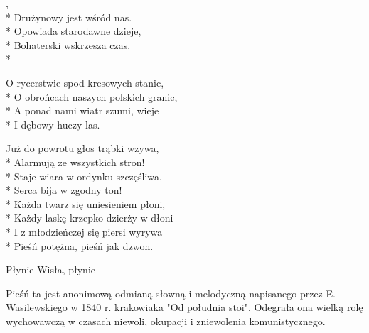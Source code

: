 \begin{lyrics}[longestline={O obrońcach naszych polskich granic,}]

,\\*
Drużynowy jest wśród nas.\\*
Opowiada starodawne dzieje,\\*
Bohaterski wskrzesza czas.\\*
\begin{indented}
O rycerstwie spod kresowych stanic,\\*
O obrońcach naszych polskich granic,\\*
A ponad nami wiatr szumi, wieje\\*
I dębowy huczy las.
\end{indented}

Już do powrotu głos trąbki wzywa,\\*
Alarmują ze wszystkich stron!\\*
Staje wiara w ordynku szczęśliwa,\\*
Serca bija w zgodny ton!\\*
Każda twarz się uniesieniem płoni,\\*
Każdy laskę krzepko dzierży w dłoni\\*
I z młodzieńczej się piersi wyrywa\\*
Pieśń potężna, pieśń jak dzwon.
\end{lyrics}



\song
{Płynie Wisła, płynie}
\begin{info}Pieśń ta jest anonimową odmianą słowną i melodyczną napisanego przez E. Wasilewskiego w 1840 r. krakowiaka "Od południa stoi". Odegrała ona wielką rolę wychowawczą w czasach niewoli, okupacji i zniewolenia komunistycznego.\end{info}

